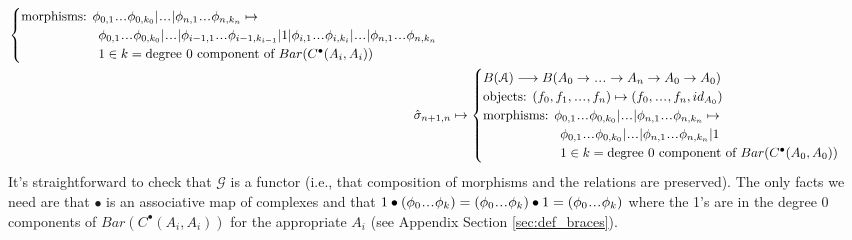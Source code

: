 \begin{align*}
\begin{cases}
  \textrm{morphisms: } \phi_{0,1}\smdots \phi_{0,k_0} | \smdots |
	\phi_{n,1}\smdots\phi_{n,k_n} \mapsto \\
  \phantom{{}morphisms: {}} 
	\phi_{0,1}\smdots \phi_{0,k_0} | \smdots |
	\phi_{i-1,1}\smdots \phi_{i-1,k_{i-1}} | 1 |
	\phi_{i,1}\smdots \phi_{i,k_i} | \smdots |
	\phi_{n,1}\smdots\phi_{n,k_n} \\
  \phantom{{}morphisms: {}}	
  	1 \in k =\textrm{degree 0 component of }
  	Bar(C^\bullet(A_i, A_i))
  \end{cases}\\    
%
\hat{\sigma}_{n+1,n}
  &\mapsto 
  \begin{cases}
  B(\mathcal{A}) \longrightarrow 
  B(A_0 \to \smdots \to A_n\to A_0 \to A_0) \\
  \textrm{objects: } (f_0,f_1, \smdots, f_n) \mapsto 
  (f_0, \smdots, f_n, id_{A_0}) \\
  \textrm{morphisms: } \phi_{0,1}\smdots \phi_{0,k_0} | \smdots |
  \phi_{n,1}\smdots\phi_{n,k_n} \mapsto \\
  \phantom{{}morphisms: {}} 
  \phi_{0,1}\smdots \phi_{0,k_0} | \smdots |
  \phi_{n,1}\smdots\phi_{n,k_n} | 1 \\
  \phantom{{}morphisms: {}} 
    1 \in k =\textrm{degree 0 component of }
    Bar(C^\bullet(A_0, A_0))  
  \end{cases}    
\end{align*}
It's straightforward to check that $\mathcal{G}$ is a 
functor (i.e., that composition of morphisms and the relations 
are preserved). The only facts we need are that $\bullet$ is 
an associative map of complexes and that 
$1 \bullet (\phi_0 \smdots \phi_k) = 
(\phi_0 \smdots \phi_k) \bullet 1 = (\phi_0 \smdots \phi_k)$ 
where the 1's are in the degree 0 components of
$Bar(C^\bullet(A_i, A_i))$ for the appropriate $A_i$ 
(see Appendix Section \ref{sec:def_braces}).